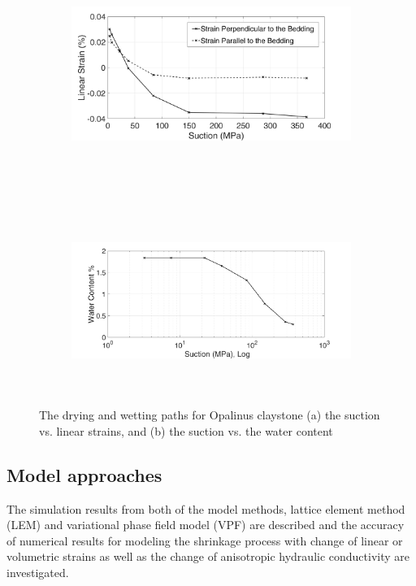 \begin{figure}[!ht]
\begin{subfigure}[b]{1\textwidth}
\centering
\includegraphics[width=11cm,height=6cm]{figures/Amir_ME6_Strain.png}
\subcaption{}
\label{fig:Amir_ME6_Strain}
\end{subfigure}
\\
\begin{subfigure}[b]{1\textwidth}
\centering
\includegraphics[width=11cm,height=6cm]{figures/Amir_ME6_Water.png}
\subcaption{}
\label{fig:Amir_ME6_Water}
\end{subfigure}
\caption{The drying and wetting paths for Opalinus claystone (a) the suction vs. linear strains, and (b) the suction vs. the water content}
\end{figure}


\subsection{Model approaches}

The simulation results from both of the model methods, lattice element method (LEM) and variational phase field model (VPF) are described and the accuracy of numerical results for modeling the shrinkage process with change of linear or volumetric strains as well as the change of anisotropic hydraulic conductivity are investigated. 

